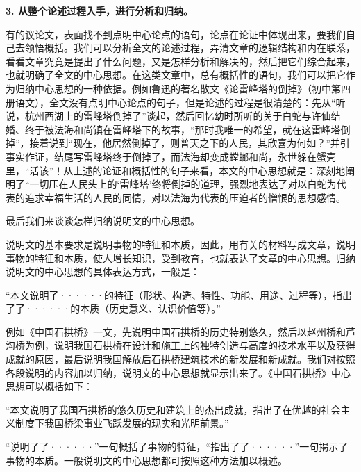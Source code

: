 \textbf{3. 从整个论述过程入手，进行分析和归纳。}

有的议论文，表面找不到点明中心论点的语句，论点在论证中体现出来，要我们自己去领悟概括。我们可以分析全文的论述过程，弄清文章的逻辑结构和内在联系，看看文章究竟是提出了什么问题，又是怎样分析和解决的，然后把它们综合起来，也就明确了全文的中心思想。在这类文章中，总有概括性的语句，我们可以把它作为归纳中心思想的一种依据。例如鲁迅的著名散文《论雷峰塔的倒掉》（初中第四册语文），全文没有点明中心论点的句子，但是论述的过程是很清楚的：先从“听说，杭州西湖上的雷峰塔倒掉了”谈起，然后回忆幼时所听的关于白蛇与许仙结婚、终于被法海和尚镇在雷峰塔下的故事，“那时我唯一的希望，就在这雷峰塔倒掉”，接着说到“现在，他居然倒掉了，则普天之下的人民，其欣喜为何如？”并引事实作证，结尾写雷峰塔终于倒掉了，而法海却变成螳螂和尚，永世躲在蟹壳里，“活该”！从上述的论证和概括性的句子来看，本文的中心思想就是：深刻地阐明了“一切压在人民头上的‘雷峰塔’终将倒掉的道理，强烈地表达了对以白蛇为代表的追求幸福生活的人民的同情，对以法海为代表的压迫者的憎恨的思想感情。

最后我们来谈谈怎样归纳说明文的中心思想。

说明文的基本要求是说明事物的特征和本质，因此，用有关的材料写成文章，说明事物的特征和本质，使人增长知识，受到教育，也就表达了文章的中心思想。归纳说明文的中心思想的具体表达方式，一般是：

“本文说明了······的特征（形状、构造、特性、功能、用途、过程等），指出了了······的本质（历史意义、认识价值等）。”

例如《中国石拱桥》一文，先说明中国石拱桥的历史特别悠久，然后以赵州桥和芦沟桥为例，说明我国石拱桥在设计和施工上的独特创造与高度的技术水平以及获得成就的原因，最后说明我国解放后石拱桥建筑技术的新发展和新成就。我们对按照各段说明的内容加以归纳，说明文的中心思想就显示出来了。《中国石拱桥》中心思想可以概括如下：

“本文说明了我国石拱桥的悠久历史和建筑上的杰出成就，指出了在优越的社会主义制度下我国桥梁事业飞跃发展的现实和光明前景。”

“说明了了······”一句概括了事物的特征，“指出了了······”一句揭示了事物的本质。一般说明文的中心思想都可按照这种方法加以概述。
\newpage